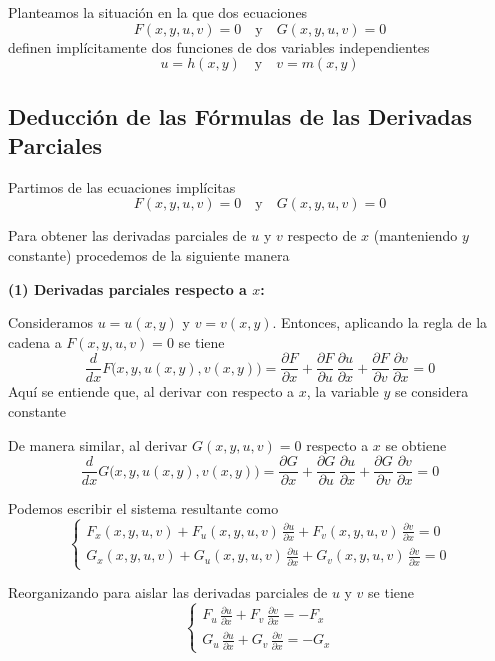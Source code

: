 \documentclass{article}
\begin{document}
Planteamos la situación en la que dos ecuaciones
\[
F(x,y,u,v)=0 \quad \text{y} \quad G(x,y,u,v)=0
\]
definen implícitamente dos funciones de dos variables independientes
\[
u = h(x,y) \quad \text{y} \quad v = m(x,y)
\]

\subsection*{Deducción de las Fórmulas de las Derivadas Parciales}

Partimos de las ecuaciones implícitas
\[
F(x,y,u,v)=0 \quad \text{y} \quad G(x,y,u,v)=0
\]

Para obtener las derivadas parciales de \( u \) y \( v \) respecto de \( x \) (manteniendo \( y \) constante) procedemos de la siguiente manera

\medskip
\noindent \textbf{(1) Derivadas parciales respecto a \( x \):}

Consideramos \( u = u(x,y) \) y \( v = v(x,y) \). Entonces, aplicando la regla de la cadena a \( F(x,y,u,v)=0 \) se tiene
\[
\frac{d}{dx}F\bigl(x,y,u(x,y),v(x,y)\bigr)
=\frac{\partial F}{\partial x}+ \frac{\partial F}{\partial u}\,\frac{\partial u}{\partial x}+ \frac{\partial F}{\partial v}\,\frac{\partial v}{\partial x}=0
\]
Aquí se entiende que, al derivar con respecto a \( x \), la variable \( y \) se considera constante

De manera similar, al derivar \( G(x,y,u,v)=0 \) respecto a \( x \) se obtiene
\[
\frac{d}{dx}G\bigl(x,y,u(x,y),v(x,y)\bigr)
=\frac{\partial G}{\partial x}+ \frac{\partial G}{\partial u}\,\frac{\partial u}{\partial x}+ \frac{\partial G}{\partial v}\,\frac{\partial v}{\partial x}=0
\]

Podemos escribir el sistema resultante como
\[
\begin{cases}
F_x(x,y,u,v)+ F_u(x,y,u,v)\,\frac{\partial u}{\partial x}+ F_v(x,y,u,v)\,\frac{\partial v}{\partial x}=0 \\
G_x(x,y,u,v)+ G_u(x,y,u,v)\,\frac{\partial u}{\partial x}+ G_v(x,y,u,v)\,\frac{\partial v}{\partial x}=0
\end{cases}
\]

Reorganizando para aislar las derivadas parciales de \( u \) y \( v \) se tiene
\[
\begin{cases}
F_u\,\frac{\partial u}{\partial x}+ F_v\,\frac{\partial v}{\partial x}=-F_x \\
G_u\,\frac{\partial u}{\partial x}+ G_v\,\frac{\partial v}{\partial x}=-G_x
\end{cases}
\]
\end{document}
